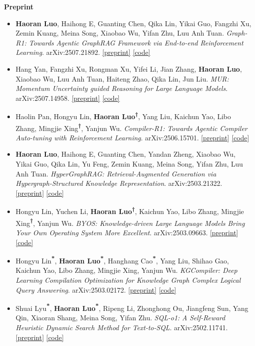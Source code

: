 \documentclass[letterpaper,11pt]{article}
\begin{document}
\vspace{0.5mm}
\textbf{Preprint}
\begin{itemize}[itemsep=0mm, topsep=2mm, leftmargin=*]
\item \textbf{Haoran Luo}, Haihong E, Guanting Chen, Qika Lin, Yikai Guo, Fangzhi Xu, Zemin Kuang, Meina Song, Xiaobao Wu, Yifan Zhu, Luu Anh Tuan. \emph{Graph-R1: Towards Agentic GraphRAG Framework via End-to-end Reinforcement Learning}. arXiv:2507.21892. \href{https://arxiv.org/abs/2507.21892}{[preprint]} \href{https://github.com/LHRLAB/Graph-R1}{[code]}
\item Hang Yan, Fangzhi Xu, Rongman Xu, Yifei Li, Jian Zhang, \textbf{Haoran Luo}, Xiaobao Wu, Luu Anh Tuan, Haiteng Zhao, Qika Lin, Jun Liu. \emph{MUR: Momentum Uncertainty guided Reasoning for Large Language Models}. arXiv:2507.14958. \href{https://arxiv.org/abs/2507.14958}{[preprint]} \href{https://github.com/yayayacc/MUR}{[code]}
\item Haolin Pan, Hongyu Lin, \textbf{Haoran Luo\textsuperscript{†}}, Yang Liu, Kaichun Yao, Libo Zhang, Mingjie Xing\textbf{\textsuperscript{†}}, Yanjun Wu. \emph{Compiler-R1: Towards Agentic Compiler Auto-tuning with Reinforcement Learning}. arXiv:2506.15701. \href{https://arxiv.org/abs/2506.15701}{[preprint]} \href{https://github.com/Panhaolin2001/Compiler-R1}{[code]}
\item \textbf{Haoran Luo}, Haihong E, Guanting Chen, Yandan Zheng, Xiaobao Wu, Yikai Guo, Qika Lin, Yu Feng, Zemin Kuang, Meina Song, Yifan Zhu, Luu Anh Tuan. \emph{HyperGraphRAG: Retrieval-Augmented Generation via Hypergraph-Structured Knowledge Representation}. arXiv:2503.21322. \href{https://arxiv.org/abs/2503.21322}{[preprint]} \href{https://github.com/LHRLAB/HyperGraphRAG}{[code]}
\item Hongyu Lin, Yuchen Li, \textbf{Haoran Luo\textsuperscript{†}}, Kaichun Yao, Libo Zhang, Mingjie Xing\textbf{\textsuperscript{†}}, Yanjun Wu. \emph{BYOS: Knowledge-driven Large Language Models Bring Your Own Operating System More Excellent}. arXiv:2503.09663. \href{https://arxiv.org/abs/2503.09663}{[preprint]} \href{https://github.com/LHY-24/BYOS}{[code]}
\item Hongyu Lin\textbf{\textsuperscript{*}}, \textbf{Haoran Luo\textsuperscript{*}}, Hanghang Cao\textbf{\textsuperscript{*}}, Yang Liu, Shihao Gao, Kaichun Yao, Libo Zhang, Mingjie Xing, Yanjun Wu. \emph{KGCompiler: Deep Learning Compilation Optimization for Knowledge Graph Complex Logical Query Answering}. arXiv:2503.02172. \href{https://arxiv.org/abs/2503.02172}{[preprint]} \href{https://github.com/LHY-24/KGCompiler}{[code]}
\item Shuai Lyu\textbf{\textsuperscript{*}}, \textbf{Haoran Luo\textsuperscript{*}}, Ripeng Li, Zhonghong Ou, Jiangfeng Sun, Yang Qin, Xiaoran Shang, Meina Song, Yifan Zhu. \emph{SQL-o1: A Self-Reward Heuristic Dynamic Search Method for Text-to-SQL}. arXiv:2502.11741. \href{https://arxiv.org/abs/2502.11741}{[preprint]} \href{https://github.com/ShuaiLyu0110/SQL-o1}{[code]}
\end{itemize}
\end{document}
